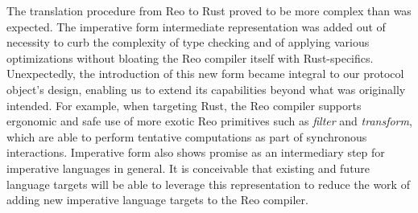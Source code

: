 The translation procedure from Reo to Rust
proved to be more complex than was expected. The imperative form intermediate representation was added out of necessity to curb the complexity of type checking and of applying various optimizations without bloating the Reo compiler itself with Rust-specifics. Unexpectedly, the introduction of this new form became integral to our protocol object's design, enabling us to extend its capabilities beyond what was originally intended. For example, when targeting Rust, the Reo compiler supports ergonomic and safe use of more exotic Reo primitives such as \textit{filter} and \textit{transform}, which are able to perform tentative computations as part of synchronous interactions. Imperative form also shows promise as an intermediary step for imperative languages in general. It is conceivable that existing and future language targets will be able to leverage this representation to reduce the work of adding new imperative language targets to the Reo compiler. 

